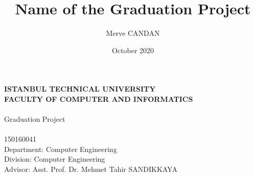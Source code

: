 \documentclass[a4paper, 12pt]{article}
\title{Name of the Graduation Project}
\author{Merve CANDAN}
\date{October 2020}
\newif\ifturkish
\newif\ifcover
\def\BASLIK{BİTİRME PROCESİNİN ADI VE SANI}%
\def\studentId{150160041}
\def\faculty{Faculty of Computer And Informatics}
\def\fakulte{Bilgisayar ve Bilişim Fakültesi}
\def\department{Computer Engineering}
\def\division{Computer Engineering}
\def\bolum{Bilgisayar Mühendisliği}
\def\program{Bilgisayar Mühendisliği}
\def\advisor{Asst. Prof. Dr. Mehmet Tahir SANDIKKAYA}
\def\danisman{Yard. Doç. Dr. Mehmet Tahir SANDIKKAYA}
\def\tarih{Haziran 2018}%
\begin{document}

\ifcover

\makeatletter
\ifturkish
	\begin{titlepage}
    \bfseries %
    \sffamily %
	\begin{center}
		\LARGE{\textbf{İSTANBUL TEKNİK ÜNİVERSİTESİ\\ 
               \MakeTextUppercase{\fakulte}} } \\
		\vspace{5.5cm}
		\LARGE{\MakeTextUppercase{\BASLIK}}\\
		\vspace{4.5cm}
		\Large{Bitirme Projesi} \\
        \vspace{0.5cm}
		\Large{\@author} \\
     	\Large{\studentId} \\
        \vspace{4cm}
        \large{Bölüm: \bolum} \\
        \large{Program: \program} \\
        \vspace{1.5cm}
        \large{Danışman: \danisman} \\
		\vspace{\fill} %
		\large{\normalfont \sffamily \tarih}
	\end{center}
	\end{titlepage}
\else
	\begin{titlepage}
    \bfseries %
    \sffamily %
	\begin{center}
		\LARGE{\textbf{ISTANBUL TECHNICAL UNIVERSITY \\ 
               \MakeTextUppercase{\faculty}} } \\
		\vspace{5.5cm}
		\LARGE{\MakeTextUppercase{\@title}}\\
		\vspace{4.5cm}
		\Large{Graduation Project} \\
        \vspace{0.5cm}
		\Large{\@author} \\
     	\Large{\studentId} \\
        \vspace{4cm}
        \large{Department: \department} \\
        \large{Division: \division} \\
        \vspace{1.5cm}
        \large{Advisor: \advisor} \\
		\vspace{\fill} %
		\large{\normalfont \sffamily \@date}
	\end{center}
	\end{titlepage}
\fi
\end{document}
